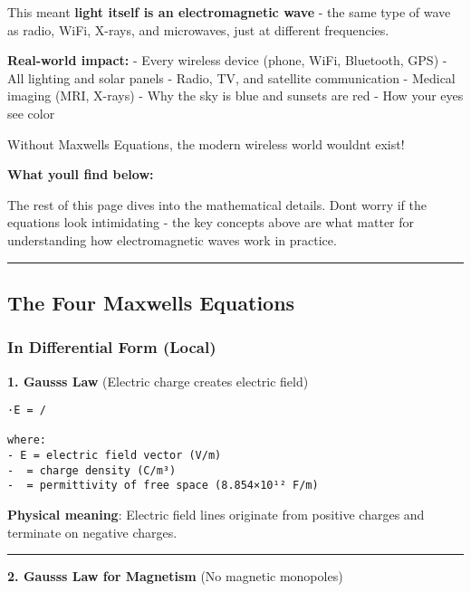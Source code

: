 This meant \textbf{light itself is an electromagnetic wave} - the same
type of wave as radio, WiFi, X-rays, and microwaves, just at different
frequencies.

\textbf{Real-world impact:} - Every wireless device (phone, WiFi,
Bluetooth, GPS) - All lighting and solar panels - Radio, TV, and
satellite communication - Medical imaging (MRI, X-rays) - Why the sky is
blue and sunsets are red - How your eyes see color

Without Maxwell\textquotesingle s Equations, the modern wireless world
wouldn\textquotesingle t exist!

\textbf{What you\textquotesingle ll find below:}

The rest of this page dives into the mathematical details.
Don\textquotesingle t worry if the equations look intimidating - the key
concepts above are what matter for understanding how electromagnetic
waves work in practice.

\begin{center}\rule{0.5\linewidth}{0.5pt}\end{center}

\subsection{\texorpdfstring{ The Four Maxwell\textquotesingle s
Equations}{ The Four Maxwell\textquotesingle s Equations}}\label{the-four-maxwells-equations}

\subsubsection{In Differential Form
(Local)}\label{in-differential-form-local}

\textbf{1. Gauss\textquotesingle s Law} (Electric charge creates
electric field)

\begin{verbatim}
·E = /

where:
- E = electric field vector (V/m)
-  = charge density (C/m³)
-  = permittivity of free space (8.854×10¹² F/m)
\end{verbatim}

\textbf{Physical meaning}: Electric field lines originate from positive
charges and terminate on negative charges.

\begin{center}\rule{0.5\linewidth}{0.5pt}\end{center}

\textbf{2. Gauss\textquotesingle s Law for Magnetism} (No magnetic
monopoles)

